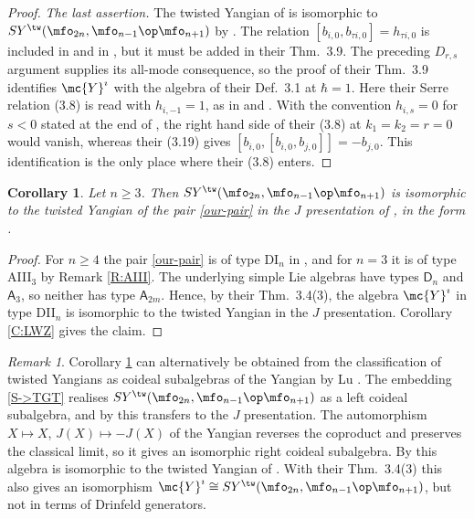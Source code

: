 \documentclass{amsart}
\newtheorem{crl}[theorem]{Corollary}
\numberwithin{equation}{section}
\theoremstyle{remark}
\newtheorem{remark}[theorem]{Remark}
\renewcommand{\,}{\kern 0.1em} %
\begin{document}
\begin{proof}
\smallskip

{\it The last assertion.} The twisted Yangian of \cite{GR16} is isomorphic to
$SY^\tw(\mfo_{2n},\mfo_{n-1}\op\mfo_{n+1})$ by \cite[Thm.~4.1, Cor.~5.2]{GR16}.
The relation $[b_{i,0},b_{\tau i,0}]=h_{\tau i,0}$ is included in \cite[Def.~2.10]{HL26} and in
\cite[Def.~3.1]{LZ25}, but it must be added in their Thm.~3.9.
The preceding $D_{r,s}$ argument supplies its all-mode consequence, so the proof of their
Thm.~3.9 identifies $\mc{Y}^\imath$ with the algebra of their Def.~3.1 at $\hbar=1$. Here their
Serre relation (3.8) is read with $h_{i,-1}=1$, as in \cite[Thm.~5.1, Rem.~5.2]{LWZ25a} and
\cite[Lem.~5.15]{Re26}. With the convention $h_{i,s}=0$ for $s<0$ stated at the end of
\cite[Def.~3.1]{LZ25}, the right hand side of their (3.8) at $k_1=k_2=r=0$ would vanish,
whereas their (3.19) gives $[b_{i,0},[b_{i,0},b_{j,0}]]=-b_{j,0}$. This identification is
the only place where their (3.8) enters.
%
\end{proof}


\begin{crl} \label{C:J}
%
Let $n\ge3$. Then $SY^\tw(\mfo_{2n},\mfo_{n-1}\op\mfo_{n+1})$ is isomorphic to the twisted
Yangian of the pair \eqref{our-pair} in the $J$ presentation of \cite{Mac02}, in the form
\cite[Def.~2.7]{HL26}.
%
\end{crl}

\begin{proof}
%
For $n\ge4$ the pair \eqref{our-pair} is of type DI$_n$ in \cite[Tab.~1]{HL26}, and for $n=3$
it is of type AIII$_3$ by Remark \ref{R:AIII}. The underlying simple Lie algebras have types
$\mathsf{D}_n$ and $\mathsf{A}_3$, so neither has type $\mathsf{A}_{2m}$. Hence, by
their Thm.~3.4(3), the algebra $\mc{Y}^\imath$ in type DII$_n$ is isomorphic to the twisted
Yangian in the $J$ presentation. Corollary \ref{C:LWZ} gives the claim.
%
\end{proof}

\begin{remark} \label{R:Lu}
%
Corollary \ref{C:J} can alternatively be obtained from the classification of twisted Yangians as
coideal subalgebras of the Yangian by Lu \cite{Lu26b}.
The embedding \eqref{S->TGT} realises $SY^\tw(\mfo_{2n},\mfo_{n-1}\op\mfo_{n+1})$ as a left
coideal subalgebra, and by \cite[Thm.~3.16]{GRW19} this transfers to the $J$ presentation. The
automorphism $X\mapsto X$, $J(X)\mapsto-J(X)$ of the Yangian reverses the coproduct and preserves
the classical limit, so it gives an isomorphic right coideal subalgebra. By
\cite[Thm.~A, Rem.~2.9]{Lu26b} this algebra is isomorphic to the twisted Yangian of
\cite[Def.~2.7]{HL26}. With their Thm.~3.4(3) this also gives an isomorphism
$\mc{Y}^\imath\cong SY^\tw(\mfo_{2n},\mfo_{n-1}\op\mfo_{n+1})$, but not in terms of Drinfeld
generators.
%
\end{remark}
\end{document}
